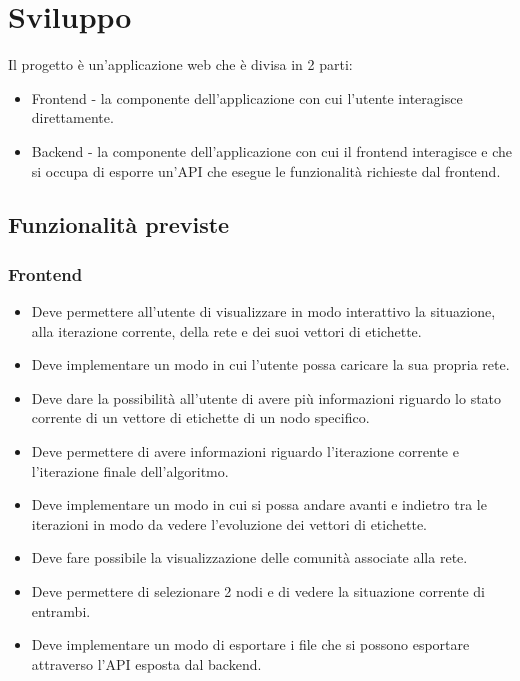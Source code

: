\documentclass[a4paper,12pt]{report}
\begin{document}
	\section{Sviluppo}
		Il progetto è un'applicazione web che è divisa in 2 parti:
		\begin{itemize}
		\item Frontend - la componente dell'applicazione con cui l'utente interagisce direttamente.
		\item Backend - la componente dell'applicazione con cui il frontend interagisce e che si occupa di esporre un'API che esegue le funzionalità richieste dal frontend.
		\end{itemize}
		
		\subsection{Funzionalità previste}
			\subsubsection{Frontend}
				\begin{itemize}
					\item Deve permettere all'utente di visualizzare in modo interattivo la situazione, alla iterazione corrente, della rete e dei suoi vettori di etichette.
					\item Deve implementare un modo in cui l'utente possa caricare la sua propria rete.
					\item Deve dare la possibilità all'utente di avere più informazioni riguardo lo stato corrente di un vettore di etichette di un nodo specifico.
					\item Deve permettere di avere informazioni riguardo l'iterazione corrente e l'iterazione finale dell'algoritmo.
					\item Deve implementare un modo in cui si possa andare avanti e indietro tra le iterazioni in modo da vedere l'evoluzione dei vettori di etichette.
					\item Deve fare possibile la visualizzazione delle comunità associate alla rete.
					\item Deve permettere di selezionare 2 nodi e di vedere la situazione corrente di entrambi.
					\item Deve implementare un modo di esportare i file che si possono esportare attraverso l'API esposta dal backend.
				\end{itemize}		
		
\end{document}
